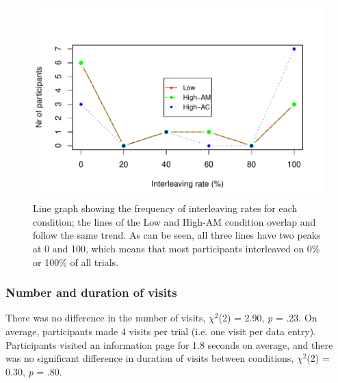 \begin{figure}
 \includegraphics[width=\textwidth]{images/ch34/ch34-4_linechart.pdf}
\caption[Study 4 frequency of interleaving rates]{Line graph showing the frequency of interleaving rates for each condition; the lines of the Low and High-AM condition overlap and follow the same trend. As can be seen, all three lines have two peaks at 0 and 100, which means that most participants interleaved on 0\% or 100\% of all trials.}
\label{fig:ch34_4-linechart}
\end{figure}

\subsubsection{Number and duration of visits}
There was no difference in the number of visits, $\chi^2$(2) = 2.90, \textit{p} = .23. On average, participants made 4 visits per trial (i.e. one visit per data entry). Participants visited an information page for 1.8 seconds on average, and there was no significant difference in duration of visits between conditions, $\chi^2$(2) = 0.30, \textit{p} = .80. 

